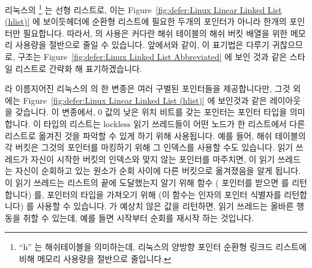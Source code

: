 리눅스의 \footnote{
	``h'' 는 해쉬테이블을 의미하는데, 리눅스의 양방향 포인터 순환형 링크드
	리스트에 비해 메모리 사용량을 절반으로 줄입니다.}
는 선형 리스트로, 이는
Figure~\ref{fig:defer:Linux Linear Linked List (hlist)}
에 보이듯헤더에  순환형 리스트에 필요한 두개의 포인터가 아니라 한개의 포인터만
필요합니다.
따라서,  의 사용은 커다란 해쉬 테이블의 해쉬 버킷 배열을 위한 메모리
사용량을 절반으로 줄일 수 있습니다.
앞에서와 같이, 이 표기법은 다루기 귀찮으므로,  구조는
Figure~\ref{fig:defer:Linux Linked List Abbreviated}
에 보인 것과 같은  스타일 리스트로 간략화 해 표기하겠습니다.

 라 이름지어진 리눅스의  의 한 변종은 여러 구별된
 포인터들을 제공합니다만, 그것 외에는
Figure~\ref{fig:defer:Linux Linear Linked List (hlist)}
에 보인것과 같은 레이아웃을 갖습니다.
이 변종에서, 0 값의 낮은 위치 비트를 갖는  포인터는  포인터
타입을 의미합니다.
이 타입의 리스트는 lockless 읽기 쓰레드들이 어떤 노드가 한 리스트에서 다른
리스트로 옮겨진 것을 파악할 수 있게 하기 위해 사용됩니다.
예를 들어, 해쉬 테이블의 각 버킷은 그것의  포인터를 마킹하기 위해 그
인덱스를 사용할 수도 있습니다.
읽기 쓰레드가 자신이 시작한 버킷의 인덱스와 맞지 않는  포인터를
마주치면, 이 읽기 쓰레드는 자신이 순회하고 있는 원소가 순회 사이에 다른
버킷으로 옮겨졌음을 알게 됩니다.
이 읽기 쓰레드는 리스트의 끝에 도달했는지 알기 위해  함수
(  포인터를 받으면  를 리턴합니다) 를,
 포인터의 타입을 가져오기 위해  (이 함수는
인자의  포인터 식별자를 리턴합니다) 를 사용할 수 있습니다.
 가 예상치 않은 값을 리턴하면, 읽기 쓰레드는 올바른
행동을 취할 수 있는데, 예를 들면 시작부터 순회를 재시작 하는 것입니다.

